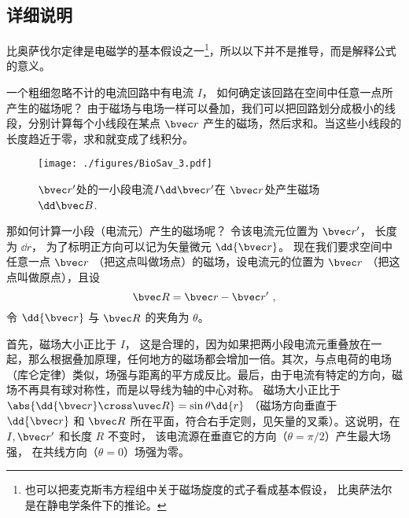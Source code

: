 \subsection{详细说明}
比奥萨伐尔定律是电磁学的基本假设之一\footnote{也可以把麦克斯韦方程组中关于磁场旋度的式子看成基本假设， 比奥萨法尔是在静电学条件下的推论。}，所以以下并不是推导，而是解释公式的意义。

一个粗细忽略不计的电流回路中有电流 $I$， 如何确定该回路在空间中任意一点所产生的磁场呢？ 由于磁场与电场一样可以叠加，我们可以把回路划分成极小的线段，分别计算每个小线段在某点 $\bvec r$ 产生的磁场，然后求和。当这些小线段的长度趋近于零，求和就变成了线积分。

\begin{figure}[ht]
\centering
\texttt{[image: ./figures/BioSav\_3.pdf]}
\caption{$\bvec r'$处的一小段电流$I \dd \bvec r'$在 $\bvec r$处产生磁场 $\dd \bvec B$.} \label{BioSav_fig3}
\end{figure}

那如何计算一小段（电流元）产生的磁场呢？ 令该电流元位置为 $\bvec r'$， 长度为 $\dd{r}$， 为了标明正方向可以记为矢量微元 $\dd{\bvec r}$。 现在我们要求空间中任意一点 $\bvec r$ （把这点叫做场点）的磁场，设电流元的位置为 $\bvec r$ （把这点叫做原点），且设
\begin{equation}
\bvec R = \bvec r - \bvec r'~,
\end{equation}
令 $\dd{\bvec r}$ 与 $\bvec R$ 的夹角为 $\theta$。

首先，磁场大小正比于 $I$， 这是合理的，因为如果把两小段电流元重叠放在一起，那么根据叠加原理，任何地方的磁场都会增加一倍。其次，与点电荷的电场（库仑定律）类似，场强与距离的平方成反比。最后，由于电流有特定的方向，磁场不再具有球对称性，而是以导线为轴的中心对称。 磁场大小正比于 $\abs{\dd{\bvec r} \cross \uvec R} = \sin\theta \dd{r}$ （磁场方向垂直于 $\dd{\bvec r}$ 和 $\bvec R$ 所在平面，符合右手定则，见矢量的叉乘）。这说明，在 $I, \bvec r'$ 和长度 $R$ 不变时， 该电流源在垂直它的方向（$\theta  = \pi /2$）产生最大场强， 在共线方向（$\theta  = 0$）场强为零。


